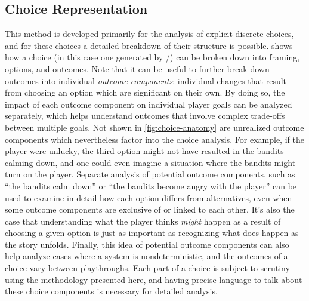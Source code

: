 \subsection{Choice Representation}

\label{sec:cp-choice-representation}

This method is developed primarily for the analysis of explicit discrete choices, and for these choices a detailed breakdown of their structure is possible.
%
 shows how a choice (in this case one generated by \dunyazad/) can be broken down into framing, options, and outcomes.
%
Note that it can be useful to further break down outcomes into individual \emph{outcome components}: individual changes that result from choosing an option which are significant on their own.
%
By doing so, the impact of each outcome component on individual player goals can be analyzed separately, which helps understand outcomes that involve complex trade-offs between multiple goals.
%
Not shown in \cref{fig:choice-anatomy} are unrealized outcome components which nevertheless factor into the choice analysis.
%
For example, if the player were unlucky, the third option might not have resulted in the bandits calming down, and one could even imagine a situation where the bandits might turn on the player.
%
Separate analysis of potential outcome components, such as ``the bandits calm down'' or ``the bandits become angry with the player'' can be used to examine in detail how each option differs from alternatives, even when some outcome components are exclusive of or linked to each other.
%
It's also the case that understanding what the player thinks \emph{might} happen as a result of choosing a given option is just as important as recognizing what does happen as the story unfolds.
%
Finally, this idea of potential outcome components can also help analyze cases where a system is nondeterministic, and the outcomes of a choice vary between playthroughs.
%
Each part of a choice is subject to scrutiny using the methodology presented here, and having precise language to talk about these choice components is necessary for detailed analysis.

